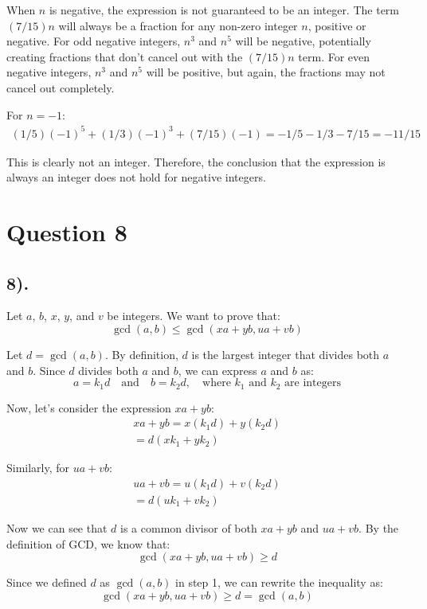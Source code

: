 \documentclass[12pt]{article}
\begin{document}
When $n$ is negative, the expression is not guaranteed to be an integer.
The term $(7/15)n$ will always be a fraction for any non-zero integer $n$, positive or negative.
For odd negative integers, $n^3$ and $n^5$ will be negative, potentially creating fractions that don't cancel out with the $(7/15)n$ term.
For even negative integers, $n^3$ and $n^5$ will be positive, but again, the fractions may not cancel out completely.

For $n = -1$:
\begin{gather*}
    (1/5){(-1)}^5 + (1/3){(-1)}^3 + (7/15)(-1) = -1/5 - 1/3 - 7/15 = -11/15
\end{gather*}

This is clearly not an integer. Therefore, the conclusion that the expression is always an integer does not hold for negative integers.

\section*{Question 8}
\subsection*{8).}
Let $a$, $b$, $x$, $y$, and $v$ be integers. We want to prove that:
\[
    \gcd(a,b) \leq \gcd(xa+yb, ua+vb)
\]

Let $d = \gcd(a,b)$. By definition, $d$ is the largest integer that divides both $a$ and $b$.
Since $d$ divides both $a$ and $b$, we can express $a$ and $b$ as:
\[
    a = k_1d \quad \text{and} \quad b = k_2d, \quad \text{where } k_1 \text{ and } k_2 \text{ are integers}
\]

Now, let's consider the expression $xa + yb$:
\begin{gather*}
    xa + yb = x(k_1d) + y(k_2d) \\
            = d(xk_1 + yk_2)
\end{gather*}

Similarly, for $ua + vb$:
\begin{gather*}
    ua + vb = u(k_1d) + v(k_2d) \\
            = d(uk_1 + vk_2)
\end{gather*}

Now we can see that $d$ is a common divisor of both $xa + yb$ and $ua + vb$.
By the definition of GCD, we know that:
\[
    \gcd(xa+yb, ua+vb) \geq d
\]

Since we defined $d$ as $\gcd(a,b)$ in step 1, we can rewrite the inequality as:
\[
    \gcd(xa+yb, ua+vb) \geq d = \gcd(a,b)
\]
\end{document}
